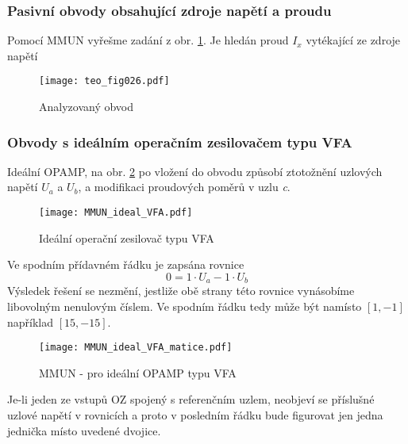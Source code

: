         \subsubsection{Pasivní obvody obsahující zdroje napětí a proudu}
          Pomocí MMUN vyřešme zadání z obr. \ref{teo:fig026}. Je hledán proud \(I_x\) 
          vytékající ze zdroje napětí 
          \begin{figure}[ht!]  %
            \centering
            \texttt{[image: teo\_fig026.pdf]}
            \caption{Analyzovaný obvod}
            \label{teo:fig026}
          \end{figure}
          
        \subsubsection{Obvody s ideálním operačním zesilovačem ty\-pu VFA}
          Ideální OPAMP, na obr. \ref{TEO:fig_MMUN_ideal_VFA} po vložení do obvodu způsobí 
          ztotožnění uzlových napětí $U_a$ a $U_b$, a modifikaci proudových poměrů v uzlu \emph{c}.
      
          \begin{figure}[ht!]
            \centering
            \texttt{[image: MMUN\_ideal\_VFA.pdf]}
            \caption[Ideální operační zesilovač typu VFA]{Ideální operační zesilovač typu VFA}
            \label{TEO:fig_MMUN_ideal_VFA}
          \end{figure}
          Ve spodním přídavném řádku je zapsána rovnice
          \begin{equation}\label{TEO:eq_MMUN_VFA}
              0 = 1\cdot U_a - 1\cdot U_b
          \end{equation}
          Výsledek řešení se nezmění, jestliže obě strany této rovnice vynásobíme libovolným 
          nenulovým číslem. Ve spodním řádku tedy může být namísto $[1,-1]$ například $[15,-15]$.
          \begin{figure}[ht!]
            \centering
            \texttt{[image: MMUN\_ideal\_VFA\_matice.pdf]}
            \caption[MMUN - pro ideální OPAMP]{MMUN - pro ideální OPAMP typu VFA}
            \label{TEO:fig_MMUN_VFA_matice}
          \end{figure}
          Je-li jeden ze vstupů OZ spojený s referenčním uzlem, neobjeví se příslušné uzlové napětí 
          v rovnicích a proto v posledním řádku bude figurovat jen jedna jednička místo uvedené 
          dvojice. 
          
